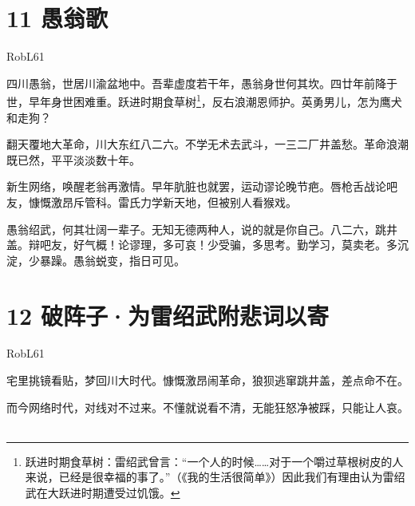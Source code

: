 \documentclass[UTF8,12pt,oneside]{ctexbook}
\begin{document}
    \newpage 
    
    \section{11 愚翁歌}
    \begin{center}
        RobL61
        
    \end{center}
    
        四川愚翁，世居川渝盆地中。吾辈虚度若干年，愚翁身世何其坎。四廿年前降于世，早年身世困难重。跃进时期食草树\footnote{跃进时期食草树：雷绍武曾言：“一个人的时候……对于一个嚼过草根树皮的人来说，已经是很幸福的事了。”（《我的生活很简单》）因此我们有理由认为雷绍武在大跃进时期遭受过饥饿。}，反右浪潮恩师护。英勇男儿，怎为鹰犬和走狗？
        
        翻天覆地大革命，川大东红八二六。不学无术去武斗，一三二厂井盖愁。革命浪潮既已然，平平淡淡数十年。
        
        新生网络，唤醒老翁再激情。早年肮脏也就罢，运动谬论晚节疤。唇枪舌战论吧友，慷慨激昂斥管科。雷氏力学新天地，但被别人看猴戏。
        
        愚翁绍武，何其壮阔一辈子。无知无德两种人，说的就是你自己。八二六，跳井盖。辩吧友，好气概！论谬理，多可哀！少受骗，多思考。勤学习，莫卖老。多沉淀，少暴躁。愚翁蜕变，指日可见。
        ~\\
        
    \newpage

    \section{12 破阵子·为雷绍武附悲词以寄}
    \begin{center}
        RobL61
        
    \end{center}
       
        宅里挑镜看贴，梦回川大时代。慷慨激昂闹革命，狼狈逃窜跳井盖，差点命不在。
        
        而今网络时代，对线对不过来。不懂就说看不清，无能狂怒净被踩，只能让人哀。
        ~\\
\end{document}
